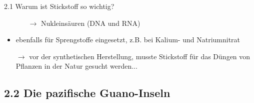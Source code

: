\documentclass[
    aspectratio=1610
    ]{beamer}
\begin{document}
\begin{frame}{2.1 Warum ist Stickstoff so wichtig?}
\begin{minipage}{7cm}
\begin{itemize}
\begin{itemize}
                    \item[$\rightarrow$] Nukleinsäuren (DNA und RNA)
                \end{itemize}
                \item ebenfalls für Sprengstoffe eingesetzt, z.B. bei Kalium- und Natriumnitrat
                \item[\alert{$\rightarrow$}]\alert{vor der synthetischen Herstellung, musste Stickstoff für das Düngen von Pflanzen in der Natur gesucht werden...}
            \end{itemize} 
        \end{minipage}
    \end{frame}
    
    \subsection{\textbf{2.2} Die pazifische Guano-Inseln}
\end{document}

